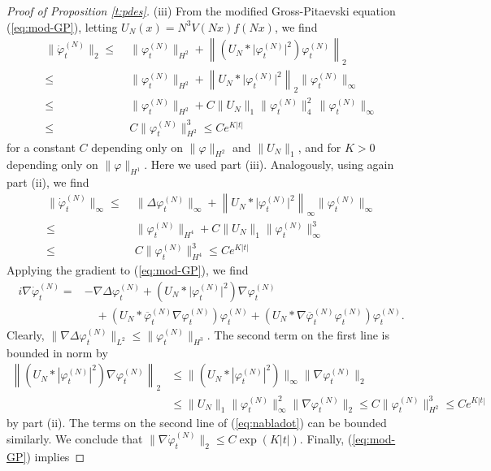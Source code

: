 \documentclass[11pt,a4paper,DIV11]{scrartcl}	%
\newcommand{\norm}[1]{\lVert#1\rVert}	%
\newcommand{\ph}{\varphi_t^{(N)}}	%
\newcommand{\phdot}{\dot{\varphi}_t^{(N)}}	%
\begin{document}
\begin{proof}[Proof of Proposition \ref{t:pdes}]
(iii) {F}rom the modified Gross-Pitaevski equation (\ref{eq:mod-GP}), letting $U_N (x) = N^3 V(Nx) f(Nx)$, we find
\[ \begin{split}
\norm{\phdot}_{2} \leq \; & \norm{\ph}_{H^2} + \left\| \left(U_N * \lvert \ph\rvert^2 \right)\ph \right\|_2 \\  \leq \; & \norm{\ph}_{H^2} + \left\| U_N * \lvert \ph\rvert^2 \right\|_2 \| \ph \|_\infty \\ \leq \; &
 \norm{\ph}_{H^2} + C \| U_N \|_1 \| \ph \|_4^2 \, \| \ph \|_\infty \\ \leq \;  &C \| \ph \|_{H^2}^3 \leq C e^{K |t|} 
\end{split} \]
for a constant $C$ depending only on $\| \varphi \|_{H^2}$ and $\| U_N \|_1$, and for $K >0$ depending only on $\| \varphi \|_{H^1}$. Here we used part (iii). Analogously, using again part (ii), we find
\[  \begin{split}
\norm{\phdot}_{\infty} \leq \; & \norm{\Delta \ph}_{\infty} + \left\| U_N * \lvert \ph\rvert^2 \right\|_\infty \| \ph \|_\infty \\ \leq \; &
 \norm{\ph}_{H^4} + C \| U_N \|_1 \| \ph \|_\infty^3  \\ \leq \;  &C \| \ph \|_{H^4}^3 \leq C e^{K |t|} 
\end{split} \]
Applying the gradient to (\ref{eq:mod-GP}), we find 
\begin{equation}\label{eq:nabladot} \begin{split}
i \nabla \phdot  = &- \nabla \Delta \ph + \left( U_N \ast \lvert \ph \rvert^2 \right) \nabla \ph \\
& \quad + \left( U_N \ast \overline{\varphi}_t^{(N)} \nabla \ph \right) \ph + \left( U_N \ast  \nabla \overline{\varphi}_t^{(N)} \ph \right) \ph. 
\end{split} \end{equation}
Clearly, $\norm{\nabla \Delta \ph}_{L^2} \leq \norm{\ph}_{H^3}$. The second term on the first line is bounded in norm by
\[\begin{split}  \left\| (U_N * |\varphi_t^{(N)}|^2) \nabla \ph \right\|_2 & \leq \| (U_N * |\varphi_t^{(N)}|^2)  \|_{\infty}   \| \nabla \ph \|_2 \\ &\leq  \|U_N\|_1 \|\varphi_t^{(N)}\|_\infty^2    \| \nabla \ph \|_2 \leq C \| \ph \|_{H^2}^3 \leq C e^{K|t|} \end{split} \]
by part (ii). The terms on the second line of (\ref{eq:nabladot}) can be bounded similarly. We conclude that $\| \nabla \dot{\varphi}_t^{(N)} \|_2 \leq C \exp (K |t|)$. Finally, (\ref{eq:mod-GP}) implies 

\end{proof}
\end{document}
